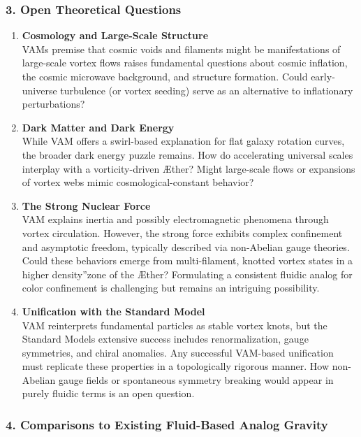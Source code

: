 \subsubsection*{3. Open Theoretical Questions}

\begin{enumerate}
    \item \textbf{Cosmology and Large-Scale Structure} \\
    VAM\rqs s premise that cosmic voids and filaments might be manifestations of large-scale vortex flows raises fundamental questions about cosmic inflation, the cosmic microwave background, and structure formation. Could early-universe turbulence (or vortex seeding) serve as an alternative to inflationary perturbations?

    \item \textbf{Dark Matter and Dark Energy} \\
    While VAM offers a swirl-based explanation for flat galaxy rotation curves, the broader dark energy puzzle remains. How do accelerating universal scales interplay with a vorticity-driven Æther? Might large-scale flows or expansions of vortex webs mimic cosmological-constant behavior?

    \item \textbf{The Strong Nuclear Force} \\
    VAM explains inertia and possibly electromagnetic phenomena through vortex circulation. However, the strong force exhibits complex confinement and asymptotic freedom, typically described via non-Abelian gauge theories. Could these behaviors emerge from multi-filament, knotted vortex states in a higher \grqq density\textquotedblright zone of the Æther? Formulating a consistent fluidic analog for color confinement is challenging but remains an intriguing possibility.

    \item \textbf{Unification with the Standard Model} \\
    VAM reinterprets fundamental particles as stable vortex knots, but the Standard Model\rqs s extensive success includes renormalization, gauge symmetries, and chiral anomalies. Any successful VAM-based unification must replicate these properties in a topologically rigorous manner. How non-Abelian gauge fields or spontaneous symmetry breaking would appear in purely fluidic terms is an open question.
\end{enumerate}

\subsubsection*{4. Comparisons to Existing Fluid-Based Analog Gravity}

